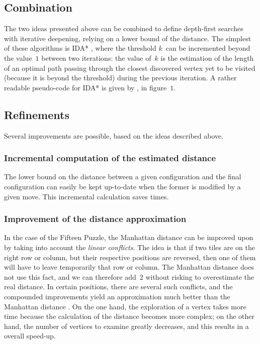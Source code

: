 \documentclass[11pt,a4paper]{article}
\begin{document}
\subsection{Combination}

The two ideas presented above can be combined to define
depth\hyp{}first searches with iterative deepening, relying on a lower
bound of the distance. The simplest of these algorithms is IDA*
\citep{korf-85}, where the threshold \(k\)~can be incremented beyond
the value~\(1\) between two iterations: the value of~\(k\) is the
estimation of the length of an optimal path passing through the
closest discovered vertex yet to be visited (because it is beyond the
threshold) during the previous iteration. A rather readable
pseudo\hyp{}code for IDA* is given by \cite{reinefeld-marsland-93}, in
figure~\(1\).

\subsection{Refinements}

Several improvements are possible, based on the ideas described above.

\subsubsection{Incremental computation of the estimated distance}
\label{sec:raf:inc}

The lower bound on the distance between a given configuration and the
final configuration can easily be kept up-to-date when the former is
modified by a given move. This incremental calculation saves times.

\subsubsection{Improvement of the distance approximation}
\label{sec:raf:conflict}

In the case of the Fifteen Puzzle, the Manhattan distance can be
improved upon by taking into account the \emph{linear conflicts}. The
idea is that if two tiles are on the right row or column, but their
respective positions are reversed, then one of them will have to leave
temporarily that row or column. The Manhattan distance does not use
this fact, and we can therefore add~\(2\) without risking to
overestimate the real distance. In certain positions, there are
several such conflicts, and the compounded improvements yield an
approximation much better than the Manhattan distance
\citep{hansson-92}. On the one hand, the exploration of a vertex takes
more time because the calculation of the distance becomes more
complex; on the other hand, the number of vertices to examine greatly
decreases, and this results in a overall speed\hyp{}up.
\end{document}
